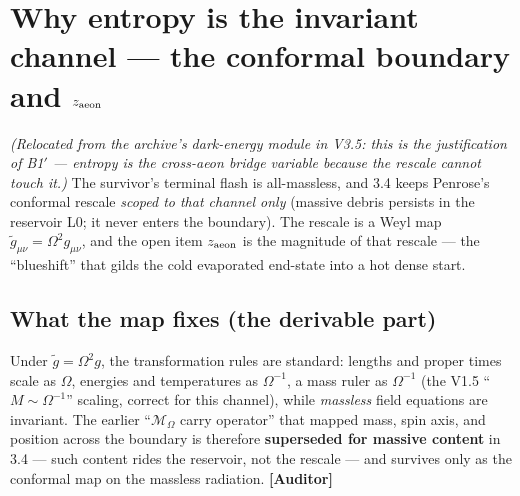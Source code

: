 \documentclass[11pt]{article}
\newcommand{\Auditor}{\textbf{\textcolor{teal!55!black}{[Auditor]}}}
\begin{document}
\section{Why entropy is the invariant channel --- the conformal boundary and $z_{\rm aeon}$}
\noindent\emph{(Relocated from the archive's dark-energy module in V3.5: this is the justification of B1$'$ --- entropy is the cross-aeon bridge variable because the rescale cannot touch it.)}
The survivor's terminal flash is all-massless, and 3.4 keeps Penrose's conformal rescale \emph{scoped to that channel only} (massive debris persists in the reservoir L0; it never enters the boundary). The rescale is a Weyl map $\tilde g_{\mu\nu}=\Omega^2 g_{\mu\nu}$, and the open item $z_{\rm aeon}$ is the magnitude of that rescale --- the ``blueshift'' that gilds the cold evaporated end-state into a hot dense start.

\subsection{What the map fixes (the derivable part)}
Under $\tilde g=\Omega^2 g$, the transformation rules are standard: lengths and proper times scale as $\Omega$, energies and temperatures as $\Omega^{-1}$, a mass ruler as $\Omega^{-1}$ (the V1.5 ``$M\!\sim\!\Omega^{-1}$'' scaling, correct for this channel), while \emph{massless} field equations are invariant. The earlier ``$\mathcal M_\Omega$ carry operator'' that mapped mass, spin axis, and position across the boundary is therefore \textbf{superseded for massive content} in 3.4 --- such content rides the reservoir, not the rescale --- and survives only as the conformal map on the massless radiation. \Auditor
\end{document}
